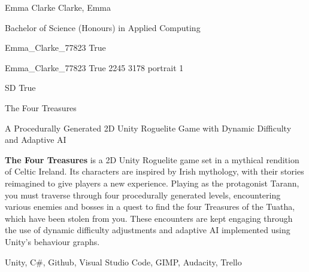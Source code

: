 
\begingroup{}\relax



\def\Key{Emma_Clarke_77823}

{Emma Clarke}
{Clarke, Emma}

{Bachelor of Science (Honours) in Applied Computing}

{Emma_Clarke_77823}
{True}

{Emma_Clarke_77823}
{True}
{2245}
{3178}
{portrait}
{1}

{SD}
{True}

{The Four Treasures}

{A Procedurally Generated 2D Unity Roguelite Game with Dynamic Difficulty and Adaptive AI}

{{\bfseries The Four Treasures} is a 2D Unity Roguelite game set in a mythical rendition of Celtic Ireland. Its characters are inspired by Irish mythology, with their stories reimagined to give players a new experience. 
Playing as the protagonist Tarann, you must traverse through four procedurally generated levels, encountering various enemies and bosses in a quest to find the four Treasures of the Tuatha, which have been stolen from you. These encounters are kept engaging through the use of dynamic difficulty adjustments and adaptive AI implemented using Unity's behaviour graphs.}

{Unity, C\#, Github, Visual Studio Code, GIMP, Audacity, Trello}

